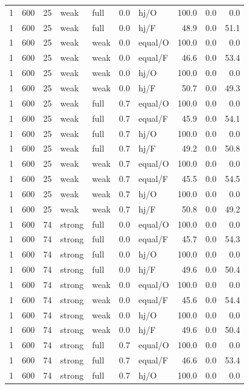 {\begin{longtable}{@{}rrrllllrrr@{}}
1 & 600 & 25 & weak & full & 0.0 & hj/O & 100.0 & 0.0 & 0.0\\
1 & 600 & 25 & weak & full & 0.0 & hj/F & 48.9 & 0.0 & 51.1\\
1 & 600 & 25 & weak & weak & 0.0 & equal/O & 100.0 & 0.0 & 0.0\\
1 & 600 & 25 & weak & weak & 0.0 & equal/F & 46.6 & 0.0 & 53.4\\
1 & 600 & 25 & weak & weak & 0.0 & hj/O & 100.0 & 0.0 & 0.0\\
1 & 600 & 25 & weak & weak & 0.0 & hj/F & 50.7 & 0.0 & 49.3\\
1 & 600 & 25 & weak & full & 0.7 & equal/O & 100.0 & 0.0 & 0.0\\
1 & 600 & 25 & weak & full & 0.7 & equal/F & 45.9 & 0.0 & 54.1\\
1 & 600 & 25 & weak & full & 0.7 & hj/O & 100.0 & 0.0 & 0.0\\
1 & 600 & 25 & weak & full & 0.7 & hj/F & 49.2 & 0.0 & 50.8\\
1 & 600 & 25 & weak & weak & 0.7 & equal/O & 100.0 & 0.0 & 0.0\\
1 & 600 & 25 & weak & weak & 0.7 & equal/F & 45.5 & 0.0 & 54.5\\
1 & 600 & 25 & weak & weak & 0.7 & hj/O & 100.0 & 0.0 & 0.0\\
1 & 600 & 25 & weak & weak & 0.7 & hj/F & 50.8 & 0.0 & 49.2\\
1 & 600 & 74 & strong & full & 0.0 & equal/O & 100.0 & 0.0 & 0.0\\
1 & 600 & 74 & strong & full & 0.0 & equal/F & 45.7 & 0.0 & 54.3\\
1 & 600 & 74 & strong & full & 0.0 & hj/O & 100.0 & 0.0 & 0.0\\
1 & 600 & 74 & strong & full & 0.0 & hj/F & 49.6 & 0.0 & 50.4\\
1 & 600 & 74 & strong & weak & 0.0 & equal/O & 100.0 & 0.0 & 0.0\\
1 & 600 & 74 & strong & weak & 0.0 & equal/F & 45.6 & 0.0 & 54.4\\
1 & 600 & 74 & strong & weak & 0.0 & hj/O & 100.0 & 0.0 & 0.0\\
1 & 600 & 74 & strong & weak & 0.0 & hj/F & 49.6 & 0.0 & 50.4\\
1 & 600 & 74 & strong & full & 0.7 & equal/O & 100.0 & 0.0 & 0.0\\
1 & 600 & 74 & strong & full & 0.7 & equal/F & 46.6 & 0.0 & 53.4\\
1 & 600 & 74 & strong & full & 0.7 & hj/O & 100.0 & 0.0 & 0.0\\

\end{longtable}}

